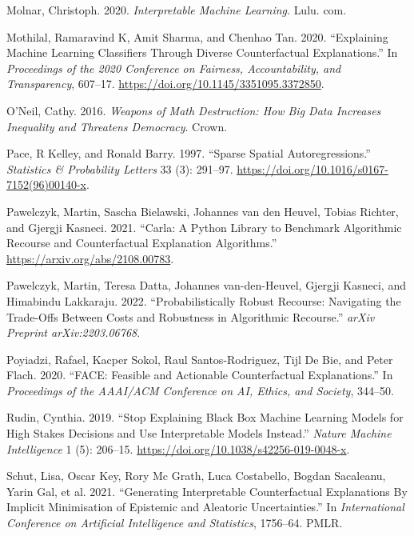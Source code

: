 \documentclass{juliacon}
\newlength{\cslhangindent}
\newlength{\cslentryspacingunit} %
\newenvironment{CSLReferences}[2] %
 {%
  \setlength{\parindent}{0pt}
  \ifodd #1
  \let\oldpar\par
  \def\par{\hangindent=\cslhangindent\oldpar}
  \fi
  \setlength{\parskip}{#2\cslentryspacingunit}
 }%
 {}
\begin{document}
\begin{CSLReferences}{1}{0}
\leavevmode{}%
Molnar, Christoph. 2020. \emph{Interpretable Machine Learning}. {Lulu.
com}.

\leavevmode{}%
Mothilal, Ramaravind K, Amit Sharma, and Chenhao Tan. 2020.
{``Explaining Machine Learning Classifiers Through Diverse
Counterfactual Explanations.''} In \emph{Proceedings of the 2020
{Conference} on {Fairness}, {Accountability}, and {Transparency}},
607--17. \url{https://doi.org/10.1145/3351095.3372850}.

\leavevmode{}%
O'Neil, Cathy. 2016. \emph{Weapons of Math Destruction: {How} Big Data
Increases Inequality and Threatens Democracy}. {Crown}.

\leavevmode{}%
Pace, R Kelley, and Ronald Barry. 1997. {``Sparse Spatial
Autoregressions.''} \emph{Statistics \& Probability Letters} 33 (3):
291--97. \url{https://doi.org/10.1016/s0167-7152(96)00140-x}.

\leavevmode{}%
Pawelczyk, Martin, Sascha Bielawski, Johannes van den Heuvel, Tobias
Richter, and Gjergji Kasneci. 2021. {``Carla: A Python Library to
Benchmark Algorithmic Recourse and Counterfactual Explanation
Algorithms.''} \url{https://arxiv.org/abs/2108.00783}.

\leavevmode{}%
Pawelczyk, Martin, Teresa Datta, Johannes van-den-Heuvel, Gjergji
Kasneci, and Himabindu Lakkaraju. 2022. {``Probabilistically {Robust}
{Recourse}: {Navigating} the {Trade}-Offs Between {Costs} and
{Robustness} in {Algorithmic} {Recourse}.''} \emph{arXiv Preprint
arXiv:2203.06768}.

\leavevmode{}%
Poyiadzi, Rafael, Kacper Sokol, Raul Santos-Rodriguez, Tijl De Bie, and
Peter Flach. 2020. {``{FACE}: {Feasible} and Actionable Counterfactual
Explanations.''} In \emph{Proceedings of the {AAAI}/{ACM Conference} on
{AI}, {Ethics}, and {Society}}, 344--50.

\leavevmode{}%
Rudin, Cynthia. 2019. {``Stop Explaining Black Box Machine Learning
Models for High Stakes Decisions and Use Interpretable Models
Instead.''} \emph{Nature Machine Intelligence} 1 (5): 206--15.
\url{https://doi.org/10.1038/s42256-019-0048-x}.

\leavevmode{}%
Schut, Lisa, Oscar Key, Rory Mc Grath, Luca Costabello, Bogdan
Sacaleanu, Yarin Gal, et al. 2021. {``Generating {Interpretable
Counterfactual Explanations By Implicit Minimisation} of {Epistemic} and
{Aleatoric Uncertainties}.''} In \emph{International {Conference} on
{Artificial Intelligence} and {Statistics}}, 1756--64. {PMLR}.


\end{CSLReferences}
\end{document}
